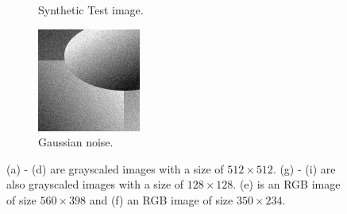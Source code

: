 \documentclass[abstracton]{scrreprt}
\begin{document}
\begin{figure}[!ht]
\begin{subfigure}[b]{0.3\textwidth}
                    \caption{Synthetic Test image.}
                \end{subfigure}
                \begin{subfigure}[b]{0.3\textwidth}
                    \includegraphics[width=\textwidth]{img/images/synth_gauss_noise.png}
                    \caption{Gaussian noise.}
                \end{subfigure}
                \caption[Images used in Chapter 5]{(a) - (d) are grayscaled images with a size of $512 \times 512$. (g) - (i) are also grayscaled images with a size of $128 \times 128$. (e) is an RGB image of size $560 \times 398$ and (f) an RGB image of size $350 \times 234$.}
            \label{fig:images_used}
            \end{figure}
        
\end{document}
